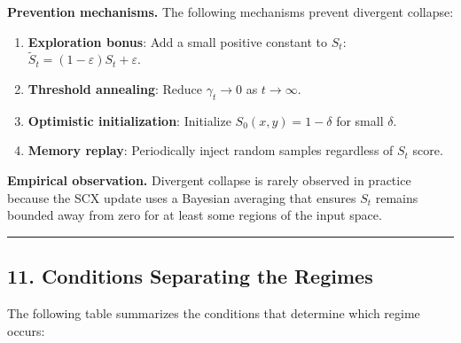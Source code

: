 \documentclass[
  12pt,
]{article}
\providecommand{\tightlist}{%
  \setlength{\itemsep}{0pt}\setlength{\parskip}{0pt}}
\begin{document}
\textbf{Prevention mechanisms.} The following mechanisms prevent
divergent collapse:

\begin{enumerate}
\def\labelenumi{\arabic{enumi}.}
\tightlist
\item
  \textbf{Exploration bonus}: Add a small positive constant to \(S_t\):
  \(\tilde{S}_t = (1-\varepsilon) S_t + \varepsilon\).
\item
  \textbf{Threshold annealing}: Reduce \(\gamma_t \to 0\) as
  \(t \to \infty\).
\item
  \textbf{Optimistic initialization}: Initialize
  \(S_0(x,y) = 1 - \delta\) for small \(\delta\).
\item
  \textbf{Memory replay}: Periodically inject random samples regardless
  of \(S_t\) score.
\end{enumerate}

\textbf{Empirical observation.} Divergent collapse is rarely observed in
practice because the SCX update uses a Bayesian averaging that ensures
\(S_t\) remains bounded away from zero for at least some regions of the
input space.

\begin{center}\rule{0.5\linewidth}{0.5pt}\end{center}

\subsection{11. Conditions Separating the
Regimes}\label{conditions-separating-the-regimes}

The following table summarizes the conditions that determine which
regime occurs:
\end{document}
